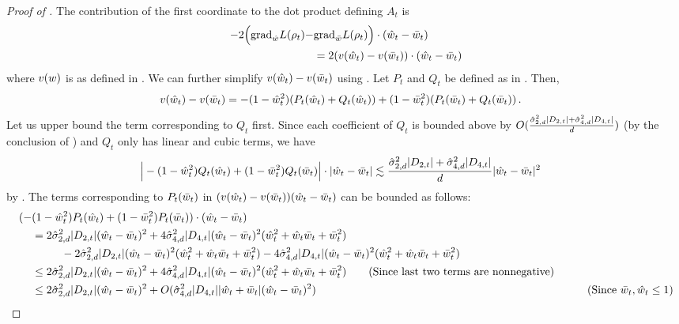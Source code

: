 \begin{proof}[Proof of ]
The contribution of the first coordinate to the dot product defining $A_t$ is
\begin{align}
-2 \Big({\textup{grad}}_{\hat{w}} L(\rho_t) - & {\textup{grad}}_{\bar{w}} L(\rho_t) \Big) \cdot (\hat{w}_t - \bar{w}_t) \\
& = 2 (v(\hat{w}_t) - v(\bar{w}_t)) \cdot (\hat{w}_t - \bar{w}_t)
\end{align}
where $v(w)$ is as defined in . We can further simplify $v(\hat{w}_t) - v(\bar{w}_t)$ using . Let $P_t$ and $Q_t$ be defined as in . Then,
\begin{align}
v(\hat{w}_t) - v(\bar{w}_t)
& = -(1 - \hat{w}_t^2) (P_t(\hat{w}_t) + Q_t(\hat{w}_t)) + (1 - \bar{w}_t^2) (P_t(\bar{w}_t) + Q_t(\bar{w}_t)) \,.
\end{align}
Let us upper bound the term corresponding to $Q_t$ first. Since each coefficient of $Q_t$ is bounded above by $O(\frac{\hat{\sigma}_{2, d}^2 |D_{2, t}| + \hat{\sigma}_{4, d}^2 |D_{4, t}|}{d})$ (by the conclusion of ) and $Q_t$ only has linear and cubic terms, we have
\begin{align}
\Big|-(1 - \hat{w}_t^2) Q_t(\hat{w}_t) + (1 - \bar{w}_t^2) Q_t(\bar{w}_t) \Big| \cdot |\hat{w}_t - \bar{w}_t|
& \lesssim \frac{\hat{\sigma}_{2, d}^2 |D_{2, t}| + \hat{\sigma}_{4, d}^2 |D_{4, t}|}{d} |\hat{w}_t - \bar{w}_t|^2
\end{align}
by . The terms corresponding to $P_t(\bar{w}_t)$ in $(v(\hat{w}_t) - v(\bar{w}_t)) (\hat{w}_t - \bar{w}_t)$ can be bounded as follows:
\begin{align}
(- &(1 - \what_t^2) P_t(\what_t) + (1 - \wbar_t^2) P_t(\wbar_t) ) \cdot (\what_t - \wbar_t) \\
& = 2 \sigmaCoeffTwo^2 |D_{2,t}| (\what_t - \wbar_t)^2 + 4 \sigmaCoeffFour^2 |D_{4,t}| (\what_t - \wbar_t)^2 (\what_t^2 + \what_t \wbar_t + \wbar_t^2) \\
& \nextlinespace - 2 \sigmaCoeffTwo^2 |D_{2,t}| (\what_t - \wbar_t)^2 (\what_t^2 + \what_t \wbar_t + \wbar_t^2) - 4 \sigmaCoeffFour^2 |D_{4,t}| (\what_t - \wbar_t)^2 (\what_t^2 + \what_t \wbar_t  + \wbar_t^2) \\
& \leq 2 \sigmaCoeffTwo^2 |D_{2,t}| (\what_t - \wbar_t)^2 + 4 \sigmaCoeffFour^2 |D_{4,t}| (\what_t - \wbar_t)^2 (\what_t^2 + \what_t \wbar_t + \wbar_t^2)  \tag{Since last two terms are nonnegative} \\
& \leq 2 \sigmaCoeffTwo^2 |D_{2,t}| (\what_t - \wbar_t)^2 + O(\sigmaCoeffFour^2 |D_{4,t}| |\what_t + \wbar_t| (\what_t - \wbar_t)^2) & \tag{Since $\wbar_t, \what_t \leq 1$}

\end{align}
\end{proof}
